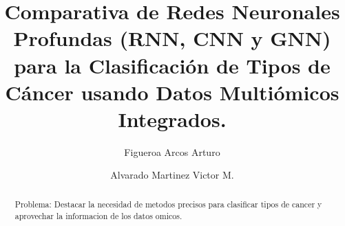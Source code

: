 \documentclass[preprint,number]{elsarticle}
\begin{document}
\begin{frontmatter}



\title{Comparativa de Redes Neuronales Profundas (RNN, CNN y GNN) para la Clasificación de Tipos de Cáncer usando Datos Multiómicos Integrados.}


\author[label1]{Figueroa Arcos Arturo}

\author[label2]{Alvarado Martinez Victor M.}

\begin{abstract}
Problema: Destacar la necesidad de metodos precisos para clasificar tipos de cancer y aprovechar la informacion de los datos omicos.


\end{abstract}
\end{frontmatter}
\end{document}
